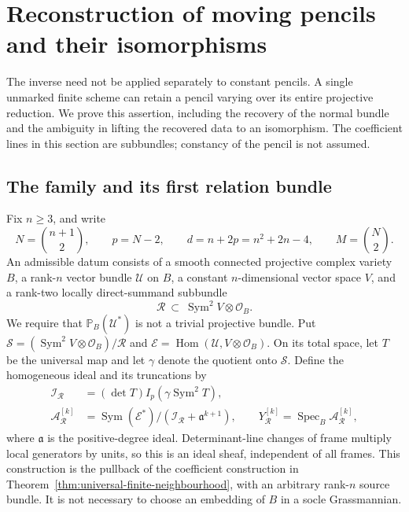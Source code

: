 \documentclass[11pt,reqno]{amsart}
\numberwithin{equation}{section}
\theoremstyle{definition}\newtheorem{definition}[theorem]{Definition}
\theoremstyle{remark}\newtheorem{remark}[theorem]{Remark}
\newcommand{\Pj}{\mathbb P}\newcommand{\A}{\mathbb A}
\newcommand{\OO}{\mathcal O}\newcommand{\II}{\mathcal I}
\DeclareMathOperator{\Sym}{Sym}\DeclareMathOperator{\Gr}{Gr}
\DeclareMathOperator{\Hom}{Hom}\DeclareMathOperator{\Tot}{Tot}
\DeclareMathOperator{\Spec}{Spec}\DeclareMathOperator{\PGL}{PGL}
\begin{document}

\section{Reconstruction of moving pencils and their isomorphisms}
\label{sec:moving-pencils-v146}

The inverse need not be applied separately to constant pencils.  A single
unmarked finite scheme can retain a pencil varying over its entire
projective reduction.  We prove this assertion, including the recovery
of the normal bundle and the ambiguity in lifting the recovered data to
an isomorphism.  The coefficient lines in this section are subbundles;
constancy of the pencil is not assumed.

\subsection{The family and its first relation bundle}
Fix \(n\ge3\), and write
\[
 N=\binom{n+1}{2},\qquad p=N-2,\qquad
 d=n+2p=n^2+2n-4,\qquad M=\binom N2.
\]
An admissible datum consists of a smooth connected projective complex
variety \(B\), a rank-\(n\) vector bundle \(\mathcal U\) on \(B\), a
constant \(n\)-dimensional vector space \(V\), and a rank-two locally
direct-summand subbundle
\[
 \mathcal R\ \subset\ \Sym^2V\otimes\OO_B.
\]
We require that \(\Pj_B(\mathcal U^*)\) is not a trivial projective
bundle.  Put \(\mathcal S=(\Sym^2V\otimes\OO_B)/\mathcal R\) and
\(\mathcal E=\Hom(\mathcal U,V\otimes\OO_B)\).  On its total space,
let \(T\) be the universal map and let \(\gamma\) denote the quotient
onto \(\mathcal S\).  Define the homogeneous ideal and its truncations by
\begin{equation}\label{eq:moving-construction-v146}
 \begin{split}
 \mathcal I_{\mathcal R}&=(\det T)I_p(\gamma\Sym^2T),\\
 \mathcal A_{\mathcal R}^{[k]}
   &=\Sym(\mathcal E^*)/
       (\mathcal I_{\mathcal R}+\mathfrak a^{k+1}),\qquad
 Y_{\mathcal R}^{[k]}=\Spec_B\mathcal A_{\mathcal R}^{[k]},
 \end{split}
\end{equation}
where \(\mathfrak a\) is the positive-degree ideal.  Determinant-line
changes of frame multiply local generators by units, so this is an
ideal sheaf, independent of all frames.  This construction is the
pullback of the coefficient construction in
Theorem~\ref{thm:universal-finite-neighbourhood}, with an arbitrary
rank-\(n\) source bundle.  It is not necessary to choose an embedding
of \(B\) in a socle Grassmannian.
\end{document}
